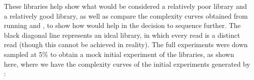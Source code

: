 \documentclass[11pt, titlepage]{article}
\begin{document}
These libraries help show what would be considered a relatively poor library and a relatively good library, as well as compare the complexity curves obtained from running  and , to show how  would help in the decision to sequence further. The black diagonal line represents an ideal library, in which every read is a distinct read (though this cannot be achieved in reality). The full experiments were down sampled at 5\% to obtain a mock initial experiment of the libraries, as shown here, where we have the complexity curves  of the initial experiments generated by :
~\newline
\newline
\begin{figure}[h!]
\centering
{}
\end{figure}

\newpage




{}
\end{document}
